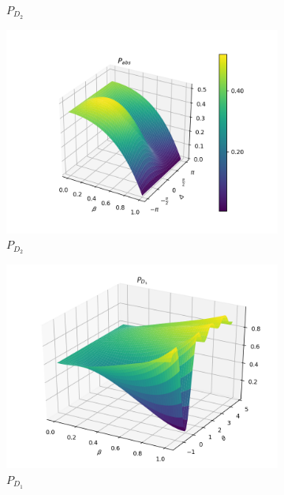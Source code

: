 \documentclass{book}
\begin{document}
\begin{figure}[H]
\begin{subfigure}[b]{0.30\linewidth}
\caption{$P_{D_{2}}$ }
\label{fig:BS1}
\end{subfigure}
\begin{subfigure}[b]{0.30\linewidth}
\includegraphics[width=\linewidth]{images/pabs_3.png}
\caption{$P_{D_{2}}$ }
\label{fig:BS1}
\end{subfigure}
\begin{subfigure}[b]{0.30\linewidth}
\includegraphics[width=\linewidth]{images/pd1_5.png}
\caption{$P_{D_{1}}$ }
\label{fig:BS1}
\end{subfigure}
\begin{subfigure}[b]{0.30\linewidth}

\end{subfigure}
\end{figure}
\end{document}
